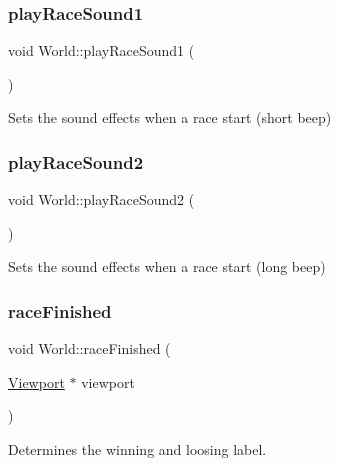 \subsubsection{\texorpdfstring{playRaceSound1}{playRaceSound1}}
{\footnotesize\ttfamily void World\+::play\+Race\+Sound1 (\begin{DoxyParamCaption}{ }\end{DoxyParamCaption})\hspace{0.3cm}{\ttfamily [signal]}}



Sets the sound effects when a race start (short beep) 

\mbox{\label{class_world_ad34df1c5b2395b378c3092647bfe8759}} 
\subsubsection{\texorpdfstring{playRaceSound2}{playRaceSound2}}
{\footnotesize\ttfamily void World\+::play\+Race\+Sound2 (\begin{DoxyParamCaption}{ }\end{DoxyParamCaption})\hspace{0.3cm}{\ttfamily [signal]}}



Sets the sound effects when a race start (long beep) 

\mbox{\label{class_world_a59863cbf211a2d2fdb5ef7ee85b2e246}} 
\subsubsection{\texorpdfstring{raceFinished}{raceFinished}}
{\footnotesize\ttfamily void World\+::race\+Finished (\begin{DoxyParamCaption}\item[{\mbox{\hyperlink{class_viewport}{Viewport}} $\ast$}]{viewport }\end{DoxyParamCaption})\hspace{0.3cm}{\ttfamily [slot]}}



Determines the winning and loosing label. 

\mbox{\label{class_world_a17d5c950e12bc73f8a45f598564e3f34}} 
